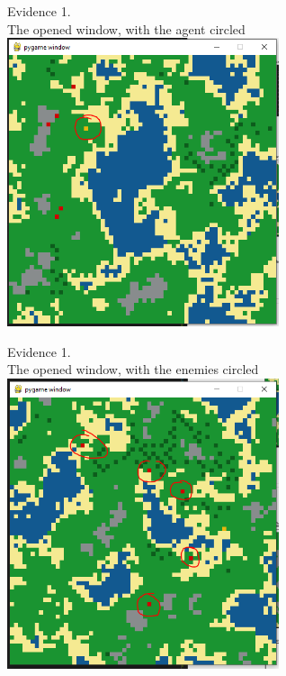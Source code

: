 \begin{center}
    {\large Evidence 1.\rn } \\ 
    \vspace{0.3cm}
    The opened window, with the agent circled \\
    \includegraphics[width=8cm]{Images/Testing/T1.8.1.PNG} \\
    \vspace{1cm}

    {\large Evidence 1.\rn } \\ 
    \vspace{0.3cm}
    The opened window, with the enemies circled \\
    \includegraphics[width=8cm]{Images/Testing/T1.9.1.PNG} \\
    \vspace{1cm}


\end{center}
